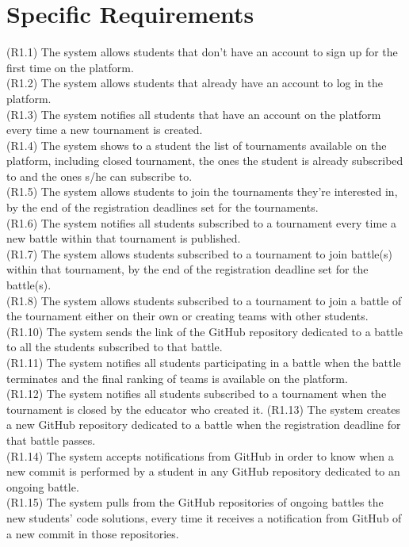 \section{Specific Requirements}
(R1.1) The system allows students that don't have an account to sign up for the first time on the platform.  \\
(R1.2) The system allows students that already have an account to log in the platform.\\
(R1.3) The system notifies all students that have an account on the platform every time a new tournament is created.\\
(R1.4) The system shows to a student the list of tournaments available on the platform, including closed tournament, the ones the student is already subscribed to and the ones s/he can subscribe to. \\
(R1.5) The system allows students to join the tournaments they’re interested in, by the end of the registration deadlines set for the tournaments.  \\
(R1.6) The system notifies all students subscribed to a tournament every time a new battle within that tournament is published.  \\
 (R1.7) The system allows students subscribed to a tournament to join battle(s) within that tournament, by the end of the registration deadline set for the battle(s). \\
 (R1.8) The system allows students subscribed to a tournament to join a battle of the tournament either on their own or creating teams with other students.  \\
 (R1.10) The system sends the link of the GitHub repository dedicated to a battle to all the students subscribed to that battle. \\
 (R1.11) The system notifies all students participating in a battle when the battle terminates and the final ranking of teams is available on the platform.  \\
 (R1.12) The system notifies all students subscribed to a tournament when the tournament is closed by the educator who created it.
 (R1.13) The system creates a new GitHub repository dedicated to a battle when the registration deadline for that battle passes. \\
(R1.14) The system accepts notifications from GitHub in order to know when a new commit is performed by a student in any GitHub repository dedicated to an ongoing battle.  \\
(R1.15) The system pulls from the GitHub repositories of ongoing battles the new students' code solutions, every time it receives a notification from GitHub of a new commit in those repositories.  \\
